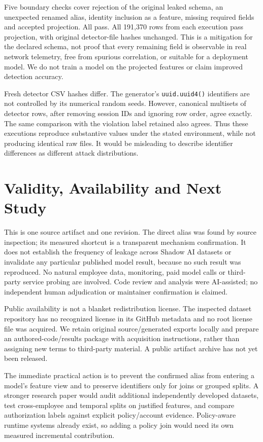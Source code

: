 \documentclass[sigconf,nonacm]{acmart}
\begin{document}
Five boundary checks cover rejection of the original leaked schema, an unexpected renamed alias, identity inclusion as a feature, missing required fields and accepted projection. All pass. All 191,370 rows from each execution pass projection, with original detector-file hashes unchanged. This is a mitigation for the declared schema, not proof that every remaining field is observable in real network telemetry, free from spurious correlation, or suitable for a deployment model. We do not train a model on the projected features or claim improved detection accuracy.

Fresh detector CSV hashes differ. The generator's \texttt{uuid.uuid4()} identifiers are not controlled by its numerical random seeds. However, canonical multisets of detector rows, after removing session IDs and ignoring row order, agree exactly. The same comparison with the violation label retained also agrees. Thus these executions reproduce substantive values under the stated environment, while not producing identical raw files. It would be misleading to describe identifier differences as different attack distributions.

\section{Validity, Availability and Next Study}
This is one source artifact and one revision. The direct alias was found by source inspection; its measured shortcut is a transparent mechanism confirmation. It does not establish the frequency of leakage across Shadow AI datasets or invalidate any particular published model result, because no such result was reproduced. No natural employee data, monitoring, paid model calls or third-party service probing are involved. Code review and analysis were AI-assisted; no independent human adjudication or maintainer confirmation is claimed.

Public availability is not a blanket redistribution license. The inspected dataset repository has no recognized license in its GitHub metadata and no root license file was acquired. We retain original source/generated exports locally and prepare an authored-code/results package with acquisition instructions, rather than assigning new terms to third-party material. A public artifact archive has not yet been released.

The immediate practical action is to prevent the confirmed alias from entering a model's feature view and to preserve identifiers only for joins or grouped splits. A stronger research paper would audit additional independently developed datasets, test cross-employee and temporal splits on justified features, and compare authorization labels against explicit policy/account evidence. Policy-aware runtime systems already exist, so adding a policy join would need its own measured incremental contribution.
\end{document}
